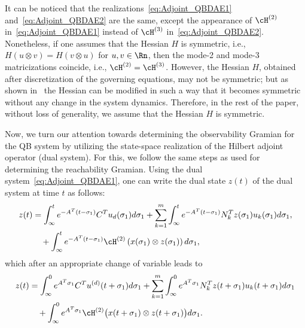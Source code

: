 It can be noticed that  the realizations~\eqref{eq:Adjoint_QBDAE1} and~\eqref{eq:Adjoint_QBDAE2} are the same, except the appearance of $\cH^{(2)}$ in~\eqref{eq:Adjoint_QBDAE1} instead of $\cH^{(3)}$ in~\eqref{eq:Adjoint_QBDAE2}. Nonetheless, if one assumes that the Hessian $H$ is symmetric,  i.e., $H(u\otimes v) = H(v\otimes u)$ for $u,v\in \Rn$, then the mode-2 and mode-3 matricizations coincide, i.e., $\cH^{(2)} = \cH^{(3)}$. However, the Hessian $H$, obtained after discretization of the governing equations,  may not be symmetric; but as shown in~\cite{morBenB15} the Hessian can be modified in such a way that it becomes symmetric without any change in the system dynamics. Therefore, in the rest of the paper,    without loss of generality, we assume that the Hessian $H$ is symmetric.

Now, we turn our attention towards determining the observability Gramian for the QB system by utilizing the state-space realization of the Hilbert adjoint operator (dual system). For this, we follow the same steps as used for determining the reachability Gramian. Using the dual system~\eqref{eq:Adjoint_QBDAE1}, one can write the dual state $z(t)$ of the dual system at time $t$ as follows:
 \begin{equation*}
\begin{aligned}
 z(t) &= \int_{\infty}^t e^{-A^T(t-\sigma_1)}C^T u_d(\sigma_1)d\sigma_1 +  \sum_{k=1}^m \int_{\infty}^t e^{-A^T(t-\sigma_1)}N_k^T z(\sigma_1)u_k(\sigma_1)d\sigma_1, \\
 &\quad + \int_{\infty}^t e^{-A^T(t-\sigma_1)}\cH^{(2)}\left(x(\sigma_1)\otimes z(\sigma_1)\right)d\sigma_1,
\end{aligned}
\end{equation*}
which after an appropriate change of variable leads to
\begin{equation}\label{eq:dual_newvar}
\begin{aligned}
z(t)  &= \int_{\infty}^0 e^{A^T \sigma_1}C^T u^{(d)}(t+\sigma_1)d\sigma_1 + \sum_{k=1}^m \int_{\infty}^0 e^{A^T\sigma_1}N_k^T z(t+\sigma_1)u_k(t+\sigma_1)d\sigma_1 \\
 &\quad + \int_{\infty}^0 e^{A^T\sigma_1}\cH^{(2)}\big(x(t+\sigma_1)\otimes z(t+\sigma_1)\big)d\sigma_1.
 \end{aligned}
\end{equation}
